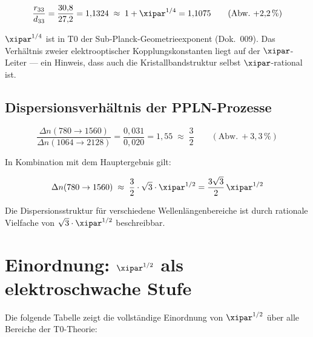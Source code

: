\begin{equation}
    \frac{r_{33}}{d_{33}} = \frac{30{,}8}{27{,}2} = 1{,}1324
    \;\approx\; 1 + \xipar^{1/4} = 1{,}1075
    \qquad (\text{Abw.}\ {+}2{,}2\,\%)
\end{equation}

$\xipar^{1/4}$ ist in T0 der Sub-Planck-Geometrieexponent (Dok.~009).
Das Verhältnis zweier elektrooptischer Kopplungskonstanten liegt auf der
$\xipar$-Leiter — ein Hinweis, dass auch die Kristallbandstruktur selbst
$\xipar$-rational ist.

\subsection{Dispersionsverhältnis der PPLN-Prozesse}

\begin{equation}
    \frac{\Delta n(780 \to 1560)}{\Delta n(1064 \to 2128)}
    = \frac{0{,}031}{0{,}020} = 1{,}55
    \;\approx\; \frac{3}{2}
    \qquad (\text{Abw.}\ {+}3{,}3\,\%)
\end{equation}

In Kombination mit dem Hauptergebnis gilt:

\begin{equation}
    \Delta n(780 \to 1560)
    \;\approx\; \frac{3}{2}\cdot\sqrt{3}\cdot\xipar^{1/2}
    = \frac{3\sqrt{3}}{2}\,\xipar^{1/2}
\end{equation}

Die Dispersionsstruktur für verschiedene Wellenlängenbereiche ist durch
rationale Vielfache von $\sqrt{3}\cdot\xipar^{1/2}$ beschreibbar.

\clearpage

\section{Einordnung: \texorpdfstring{$\xipar^{1/2}$}{xi\^{}(1/2)} als
  elektroschwache Stufe}
\label{sec:einordnung}

Die folgende Tabelle zeigt die vollständige Einordnung von $\xipar^{1/2}$
über alle Bereiche der T0-Theorie:

